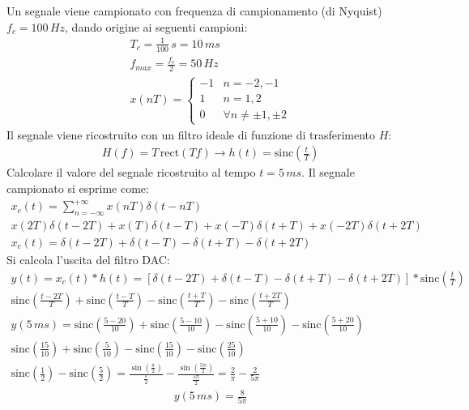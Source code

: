 \documentclass{article}
\newcommand{\rect}{\mbox{rect}}
\newcommand{\sinc}{\mbox{sinc}}
\begin{document}
Un segnale viene campionato con frequenza di campionamento (di Nyquist) $f_c=100\,Hz$, dando origine ai seguenti campioni:
\begin{gather*}
    T_c=\displaystyle\frac{1}{100}\,s=10\,ms\\
    f_{max}=\frac{f_c}{2}=50\,Hz\\
    x(nT)=\begin{cases}
        -1&n=-2,-1\\
        1&n=1,2\\
        0&\forall n\neq\pm1,\pm2
    \end{cases}
\end{gather*}
Il segnale viene ricostruito con un filtro ideale di funzione di trasferimento $H$:
\begin{gather*}
    H(f)=T\,\rect(Tf)\to  h(t)=\sinc\left(\frac{t}{T}\right)
\end{gather*} 
Calcolare il valore del segnale ricostruito al tempo $t=5\,ms$. Il segnale campionato si esprime come:
\begin{gather*}
    x_c(t)=\displaystyle\sum_{n=-\infty}^{+\infty}x(nT)\delta(t-nT)\\
    x(2T)\delta(t-2T)+x(T)\delta(t-T)+x(-T)\delta(t+T)+x(-2T)\delta(t+2T)\\
    x_c(t)=\delta(t-2T)+\delta(t-T)-\delta(t+T)-\delta(t+2T)
\end{gather*}
Si calcola l'uscita del filtro DAC:
\begin{gather*}
    y(t)=x_c(t)*h(t)=\left[\delta(t-2T)+\delta(t-T)-\delta(t+T)-\delta(t+2T)\right]*\sinc\left(\displaystyle\frac{t}{T}\right)\\
    \displaystyle\sinc\left(\frac{t-2T}{T}\right)+\sinc\left(\frac{t-T}{T}\right)-\sinc\left(\frac{t+T}{T}\right)-\sinc\left(\frac{t+2T}{T}\right)\\
    y(5\,ms)=\displaystyle\sinc\left(\frac{5-20}{10}\right)+\sinc\left(\frac{5-10}{10}\right)-\sinc\left(\frac{5+10}{10}\right)-\sinc\left(\frac{5+20}{10}\right)\\
    \displaystyle\sinc\left(\frac{15}{10}\right)+\sinc\left(\frac{5}{10}\right)-\sinc\left(\frac{15}{10}\right)-\sinc\left(\frac{25}{10}\right)\\
    \displaystyle\sinc\left(\frac{1}{2}\right)-\sinc\left(\frac{5}{2}\right)=\frac{\sin\left(\frac{\pi}{2}\right)}{\frac{\pi}{2}}-\frac{\sin\left(\frac{5\pi}{2}\right)}{\frac{5\pi}{2}}=\frac{2}{\pi}-\frac{2}{5\pi}
\end{gather*}
\begin{gather}
    y(5\,ms)=\displaystyle\frac{8}{5\pi}
\end{gather}
\end{document}

